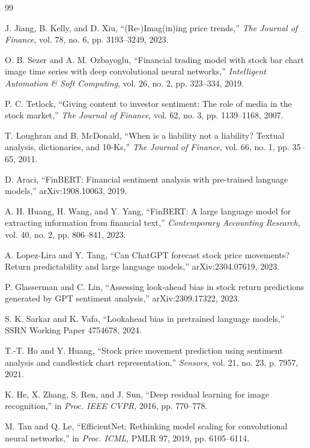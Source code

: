 \documentclass[conference]{IEEEtran}
\begin{document}
\begin{thebibliography}{99}

 J. Jiang, B. Kelly, and D. Xiu, ``(Re-)Imag(in)ing price trends,'' \emph{The Journal of Finance}, vol. 78, no. 6, pp. 3193--3249, 2023.

 O. B. Sezer and A. M. Ozbayoglu, ``Financial trading model with stock bar chart image time series with deep convolutional neural networks,'' \emph{Intelligent Automation \& Soft Computing}, vol. 26, no. 2, pp. 323--334, 2019.

 P. C. Tetlock, ``Giving content to investor sentiment: The role of media in the stock market,'' \emph{The Journal of Finance}, vol. 62, no. 3, pp. 1139--1168, 2007.

 T. Loughran and B. McDonald, ``When is a liability not a liability? Textual analysis, dictionaries, and 10-Ks,'' \emph{The Journal of Finance}, vol. 66, no. 1, pp. 35--65, 2011.

 D. Araci, ``FinBERT: Financial sentiment analysis with pre-trained language models,'' arXiv:1908.10063, 2019.

 A. H. Huang, H. Wang, and Y. Yang, ``FinBERT: A large language model for extracting information from financial text,'' \emph{Contemporary Accounting Research}, vol. 40, no. 2, pp. 806--841, 2023.

 A. Lopez-Lira and Y. Tang, ``Can ChatGPT forecast stock price movements? Return predictability and large language models,'' arXiv:2304.07619, 2023.

 P. Glasserman and C. Lin, ``Assessing look-ahead bias in stock return predictions generated by GPT sentiment analysis,'' arXiv:2309.17322, 2023.

 S. K. Sarkar and K. Vafa, ``Lookahead bias in pretrained language models,'' SSRN Working Paper 4754678, 2024.

 T.-T. Ho and Y. Huang, ``Stock price movement prediction using sentiment analysis and candlestick chart representation,'' \emph{Sensors}, vol. 21, no. 23, p. 7957, 2021.

 K. He, X. Zhang, S. Ren, and J. Sun, ``Deep residual learning for image recognition,'' in \emph{Proc. IEEE CVPR}, 2016, pp. 770--778.

 M. Tan and Q. Le, ``EfficientNet: Rethinking model scaling for convolutional neural networks,'' in \emph{Proc. ICML}, PMLR 97, 2019, pp. 6105--6114.


\end{thebibliography}
\end{document}
